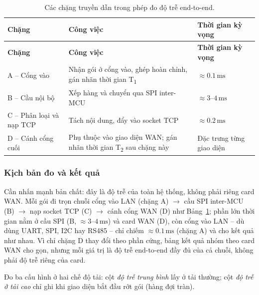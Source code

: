 \begin{longtable}{|p{3cm}|p{7cm}|p{4cm}|}
    \caption{Các chặng truyền dẫn trong phép đo độ trễ end-to-end.}
    \label{tab:e2e_stages} \\
    \hline
    \textbf{Chặng} & \textbf{Công việc} & \textbf{Thời gian kỳ vọng} \\ \hline
    \endfirsthead
    \hline
    \textbf{Chặng} & \textbf{Công việc} & \textbf{Thời gian kỳ vọng} \\ \hline
    \endhead
    \hline
    \endfoot
    \endlastfoot
    A -- Cổng vào & Nhận gói ở cổng vào, ghép hoàn chỉnh, gán nhãn thời gian T\textsubscript{1} & $\approx 0{.}1\,\text{ms}$ \\ \hline
    B -- Cầu nội bộ & Xếp hàng và chuyển qua SPI inter-MCU & $\approx 3$--$4\,\text{ms}$ \\ \hline
    C -- Phân loại và nạp TCP & Tách nội dung, đẩy vào socket TCP & $\approx 0{.}2\,\text{ms}$ \\ \hline
    D -- Cánh cổng cuối & Phụ thuộc vào giao diện WAN; gán nhãn thời gian T\textsubscript{2} sau chặng này & Đặc trưng từng giao diện \\ \hline
\end{longtable}

\subsubsection{Kịch bản đo và kết quả}

Cần nhấn mạnh bản chất: đây là độ trễ của toàn hệ thống, không phải riêng card WAN. Mỗi gói đi trọn chuỗi cổng vào LAN (chặng A) $\rightarrow$ cầu SPI inter-MCU (B) $\rightarrow$ nạp socket TCP (C) $\rightarrow$ cánh cổng WAN (D) như Bảng~\ref{tab:e2e_stages}; phần lớn thời gian nằm ở cầu SPI (B, $\approx 3$--$4\,\text{ms}$) và card WAN (D), còn cổng vào LAN -- dù dùng UART, SPI, I2C hay RS485 -- chỉ chiếm $\approx 0{.}1\,\text{ms}$ (chặng A) và cho kết quả như nhau. Vì chỉ chặng D thay đổi theo phần cứng, bảng kết quả nhóm theo card WAN cho gọn, nhưng mỗi giá trị là độ trễ end-to-end đầy đủ của cả chuỗi, không phải độ trễ riêng của card.

Đo ba cấu hình ở hai chế độ tải: cột \textit{độ trễ trung bình} lấy ở tải thường; cột \textit{độ trễ ở tải cao} chỉ ghi khi giao diện bắt đầu rớt gói (hàng đợi tràn).

